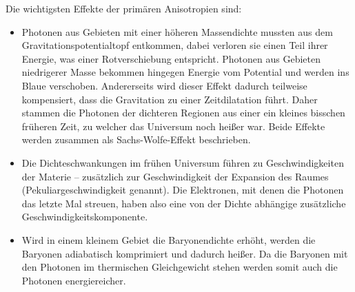 \documentclass[10pt,a4paper]{article}
\begin{document}
Die wichtigsten Effekte der primären Anisotropien sind:
\begin{itemize}
\item Photonen aus Gebieten mit einer höheren Massendichte mussten aus dem Gravitationspotentialtopf entkommen, dabei verloren sie einen Teil ihrer Energie, was einer Rotverschiebung entspricht. Photonen aus Gebieten niedrigerer Masse bekommen hingegen Energie vom Potential und werden ins Blaue verschoben. Andererseits wird dieser Effekt dadurch teilweise kompensiert, dass die Gravitation zu einer Zeitdilatation führt. Daher stammen die Photonen der dichteren Regionen aus einer ein kleines bisschen früheren Zeit, zu welcher das Universum noch heißer war. Beide Effekte werden zusammen als Sachs-Wolfe-Effekt beschrieben. %
\item Die Dichteschwankungen im frühen Universum führen zu Geschwindigkeiten der Materie -- zusätzlich zur Geschwindigkeit der Expansion des Raumes (Pekuliargeschwindigkeit genannt). Die Elektronen, mit denen die Photonen das letzte Mal streuen, haben also eine von der Dichte abhängige zusätzliche Geschwindigkeitskomponente. %
\item Wird in einem kleinem Gebiet die Baryonendichte erhöht, werden die Baryonen adiabatisch komprimiert und dadurch heißer. Da die Baryonen mit den Photonen im thermischen Gleichgewicht stehen werden somit auch die Photonen energiereicher.
\end{itemize}
\end{document}
